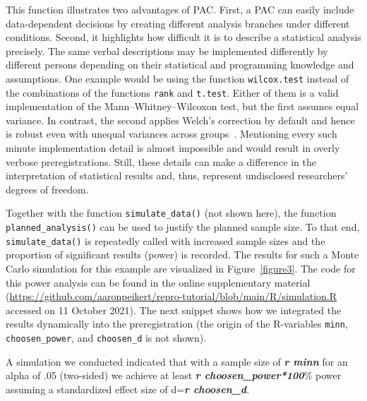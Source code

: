 \documentclass[psych,tutorial,accept,moreauthors,pdftex]{Definitions/mdpi}
\newenvironment{Shaded}{\begin{snugshade}}{\end{snugshade}}
\newcommand{\InformationTok}[1]{\textcolor[rgb]{0.56,0.35,0.01}{\textbf{\textit{#1}}}}
\newcommand{\NormalTok}[1]{#1}
\begin{document}
\begin{paracol}{2}
\switchcolumn


This function illustrates two advantages of PAC. First, a PAC can easily
include data-dependent decisions by creating different analysis branches
under different conditions. Second, it highlights how difficult it is to
describe a statistical analysis precisely. The same verbal descriptions
may be implemented differently by different persons depending on their
statistical and programming knowledge and assumptions. One example would
be using the function \texttt{wilcox.test} instead of the combinations
of the functions \texttt{rank} and \texttt{t.test}. Either of them is a
valid implementation of the Mann--Whitney--Wilcoxon test, but the first
assumes equal variance. In contrast, the second applies Welch's
correction by default and hence is robust even with unequal variances
across groups~\citep{zimmermanRankTransformationsPower1993}. Mentioning
every such minute implementation detail is almost impossible and would
result in overly verbose preregistrations. Still, these details can make
a difference in the interpretation of statistical results and, thus,
represent undisclosed researchers' degrees of freedom.

Together with the function \texttt{simulate\_data()} (not shown here),
the function \texttt{planned\_\linebreak analysis()} can be used to justify the
planned sample size. To that end, \texttt{simulate\_data()} is
repeatedly called with increased sample sizes and the proportion of
significant results (power) is recorded. The results for such a Monte
Carlo simulation for this example are visualized in {Figure~\ref{figure3}.}
 The code
for this power analysis can be found in the {online supplementary material}
(\url{https://github.com/aaronpeikert/repro-tutorial/blob/main/R/simulation.R} accessed on 11 October 2021). The next snippet shows how we integrated the
results dynamically into the preregistration (the origin of the
R-variables \texttt{minn}, \texttt{choosen\_power}, and
\texttt{choosen\_d} is not shown).




\vspace{+6pt}
\end{paracol}
\nointerlineskip
\begin{adjustwidth}{0.5cm}{0cm} 
\begin{Shaded}
\begin{Highlighting}[]
\NormalTok{A simulation we conducted indicated that with a sample size of }\InformationTok{\textasciigrave{}r minn\textasciigrave{}}\NormalTok{ for}
\NormalTok{an alpha of .05 (two{-}sided) we achieve at least }\InformationTok{\textasciigrave{}r choosen\_power*100\textasciigrave{}}\NormalTok{\% power}
\NormalTok{assuming a standardized effect size of d=}\InformationTok{\textasciigrave{}r choosen\_d\textasciigrave{}}\NormalTok{.}
\end{Highlighting}
\end{Shaded}
\end{adjustwidth}
\end{document}
